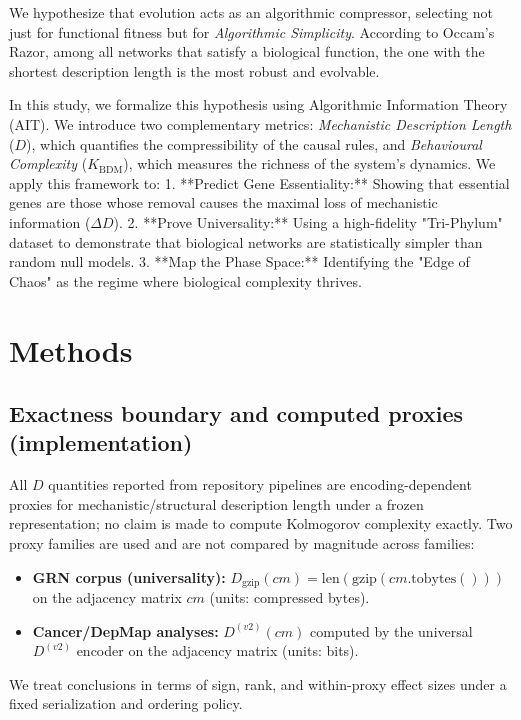 \documentclass{article}
\begin{document}
We hypothesize that evolution acts as an algorithmic compressor, selecting not just for functional fitness but for \textit{Algorithmic Simplicity}. According to Occam's Razor, among all networks that satisfy a biological function, the one with the shortest description length is the most robust and evolvable.

In this study, we formalize this hypothesis using Algorithmic Information Theory (AIT). We introduce two complementary metrics: \textit{Mechanistic Description Length} ($D$), which quantifies the compressibility of the causal rules, and \textit{Behavioural Complexity} ($K_{\mathrm{BDM}}$), which measures the richness of the system's dynamics. We apply this framework to:
1.  **Predict Gene Essentiality:** Showing that essential genes are those whose removal causes the maximal loss of mechanistic information ($\Delta D$).
2.  **Prove Universality:** Using a high-fidelity "Tri-Phylum" dataset to demonstrate that biological networks are statistically simpler than random null models.
3.  **Map the Phase Space:** Identifying the "Edge of Chaos" as the regime where biological complexity thrives.

\section{Methods}

\subsection{Exactness boundary and computed proxies (implementation)}
All $D$ quantities reported from repository pipelines are encoding-dependent proxies for mechanistic/structural description length under a frozen representation; no claim is made to compute Kolmogorov complexity exactly. Two proxy families are used and are not compared by magnitude across families:
\begin{itemize}
    \item \textbf{GRN corpus (universality):} $D_{\mathrm{gzip}}(cm)=\mathrm{len}(\mathrm{gzip}(cm.\mathrm{tobytes}()))$ on the adjacency matrix $cm$ (units: compressed bytes).
    \item \textbf{Cancer/DepMap analyses:} $D^{(v2)}(cm)$ computed by the universal $D^{(v2)}$ encoder on the adjacency matrix (units: bits).
\end{itemize}
We treat conclusions in terms of sign, rank, and within-proxy effect sizes under a fixed serialization and ordering policy.
\end{document}
